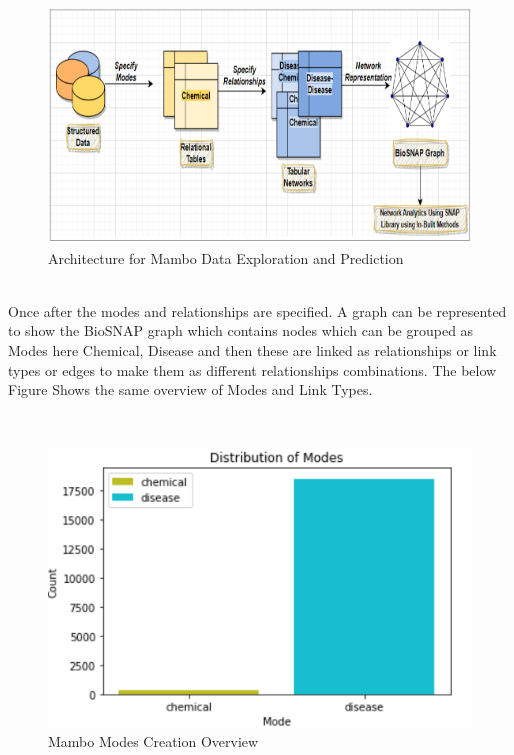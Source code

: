 \documentclass[journal,transmag]{J-NaNA}
\begin{document}
\begin{figure}[htbp]
\centering
\includegraphics[width=\linewidth]{mambo_arch.PNG} 
\caption{Architecture for Mambo Data Exploration and Prediction}
\label{fig:mambo_architecture} %
\end{figure}

\\
Once after the modes and relationships are specified. A graph can be represented to show the BioSNAP graph which contains nodes which can be grouped as Modes here Chemical, Disease and then these are linked as relationships or link types or edges to make them as different relationships combinations. The below Figure Shows the same overview of Modes and Link Types. 

\\
\begin{figure}[htbp]
\centering
\includegraphics[width=\linewidth]{Modes.png} 
\caption{Mambo Modes Creation Overview}
\label{fig:mambo_architecture} %
\end{figure}
\end{document}
